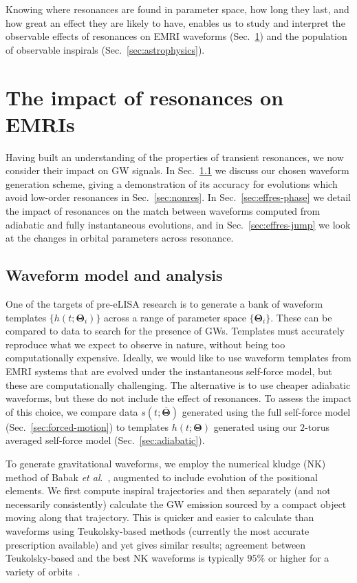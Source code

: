 \documentclass[aps,prd,amsfonts,amssymb,amsmath,nofootinbib,showpacs,superscriptaddress,twocolumn,floatfix]{revtex4-1}
\newcommand{\secref}[1]{Sec.~\ref{sec:#1}}
\begin{document}
Knowing where resonances are found in parameter space, how long they last, and how great an effect they are likely to have, enables us to study and interpret the observable effects of resonances on EMRI waveforms (\secref{waveforms}) and the population of observable inspirals (\secref{astrophysics}).


\section{The impact of resonances on EMRIs}
\label{sec:waveforms}

Having built an understanding of the properties of transient resonances, we now consider their impact on GW signals. In \secref{kludge} we discuss our chosen waveform generation scheme, giving a demonstration of its accuracy for evolutions which avoid low-order resonances in \secref{nonres}. In \secref{effres-phase} we detail the impact of resonances on the match between waveforms computed from adiabatic and fully instantaneous evolutions, and in \secref{effres-jump} we look at the changes in orbital parameters across resonance.

\subsection{Waveform model and analysis}
\label{sec:kludge}

One of the targets of pre-eLISA research is to generate a bank of waveform templates $\{h(t;\boldsymbol{\Theta}_i)\}$ across a range of parameter space $\{\boldsymbol{\Theta}_i\}$. These can be compared to data to search for the presence of GWs. Templates must accurately reproduce what we expect to observe in nature, without being too computationally expensive. Ideally, we would like to use waveform templates from EMRI systems that are evolved under the instantaneous self-force model, but these are computationally challenging. The alternative is to use cheaper adiabatic waveforms, but these do not include the effect of resonances. To assess the impact of this choice, we compare data $s(t;\bar{\boldsymbol{\Theta}})$ generated using the full self-force model (\secref{forced-motion}) to templates $h(t;\boldsymbol{\Theta})$ generated using our $2$-torus averaged self-force model (\secref{adiabatic}).

To generate gravitational waveforms, we employ the numerical kludge (NK) method of Babak {\it{et al}}.~\cite{Babak2007}, augmented to include evolution of the positional elements. We first compute inspiral trajectories and then separately (and not necessarily consistently) calculate the GW emission sourced by a compact object moving along that trajectory. This is quicker and easier to calculate than waveforms using Teukolsky-based methods (currently the most accurate prescription available) and yet gives similar results; agreement between Teukolsky-based and the best NK waveforms is typically $95\%$ or higher for a variety of orbits~\cite{Babak2007, Berry2013}.
\end{document}
